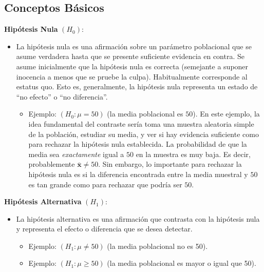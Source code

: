 \documentclass[
  letterpaper,
  DIV=11,
  numbers=noendperiod]{scrreprt}
\providecommand{\tightlist}{%
  \setlength{\itemsep}{0pt}\setlength{\parskip}{0pt}}\usepackage{longtable,booktabs,array}
\begin{document}
\hypertarget{conceptos-buxe1sicos-1}{%
\subsection{Conceptos Básicos}\label{conceptos-buxe1sicos-1}}

\textbf{Hipótesis Nula} \((H_0)\):

\begin{itemize}
\item
  La hipótesis nula es una afirmación sobre un parámetro poblacional que
  se asume verdadera hasta que se presente suficiente evidencia en
  contra. Se asume inicialmente que la hipótesis nula es correcta
  (semejante a suponer inocencia a menos que se pruebe la culpa).
  Habitualmente corresponde al estatus quo. Esto es, generalmente, la
  hipótesis nula representa un estado de ``no efecto'' o ``no
  diferencia''.

  \begin{itemize}
  \tightlist
  \item
    Ejemplo: \((H_0: \mu = 50)\) (la media poblacional es \(50\)). En
    este ejemplo, la idea fundamental del contraste sería toma una
    muestra aleatoria simple de la población, estudiar su media, y ver
    si hay evidencia suficiente como para rechazar la hipótesis nula
    establecida. La probabilidad de que la media sea \emph{exactamente}
    igual a \(50\) en la muestra es muy baja. Es decir, probablemente
    \(\bar{\mathbf{x}} \neq 50\). Sin embargo, lo importante para
    rechazar la hipótesis nula es si la diferencia encontrada entre la
    media muestral y \(50\) es tan grande como para rechazar que podría
    ser \(50\).
  \end{itemize}
\end{itemize}

\textbf{Hipótesis Alternativa} \((H_1)\):

\begin{itemize}
\item
  La hipótesis alternativa es una afirmación que contrasta con la
  hipótesis nula y representa el efecto o diferencia que se desea
  detectar.

  \begin{itemize}
  \tightlist
  \item
    Ejemplo: \((H_1: \mu \neq 50)\) (la media poblacional no es 50).
  \item
    Ejemplo: \((H_1: \mu \geq 50)\) (la media poblacional es mayor o
    igual que 50).
  \end{itemize}
\end{itemize}
\end{document}
